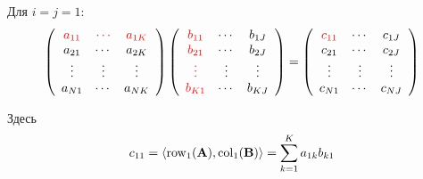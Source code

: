 \begin{frame}
    
    \vspace{2em}
    Для $i=j=1$:
    \small\begin{equation*}
        \left(
        \begin{array}{ccc}
            \textcolor{red}{a_{11}} & \textcolor{red}{\cdots} & \textcolor{red}{a_{1K}} \\
            a_{21} & \cdots & a_{2K} \\
            \vdots & \vdots & \vdots \\
            a_{N1} & \cdots & a_{NK} \\
        \end{array}
        \right)
        \left(
        \begin{array}{ccc}
            \textcolor{red}{b_{11}} & \cdots & b_{1J} \\
            \textcolor{red}{b_{21}} & \cdots & b_{2J} \\
            \textcolor{red}{\vdots} & \vdots & \vdots \\
            \textcolor{red}{b_{K1}} & \cdots & b_{KJ} \\
        \end{array}
        \right)
        =
        \left(
        \begin{array}{ccc}
            \textcolor{red}{c_{11}} & \cdots & c_{1J} \\
            c_{21} & \cdots & c_{2J} \\
            \vdots & \vdots & \vdots \\
            c_{N1} & \cdots & c_{NJ} \\
        \end{array}
        \right)
    \end{equation*}
    
    \vspace{1em}
    Здесь 
    \begin{equation*}
        c_{11} = \left\langle{\operatorname{row}_1(\mathbf A) , \operatorname{col}_1 (\mathbf B)}\right\rangle = \sum_{k=1}^K a_{1k} b_{k1}
    \end{equation*}

\end{frame}

